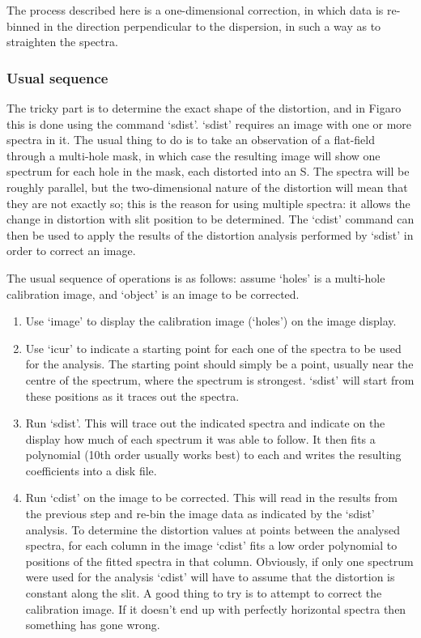    The process described here is a one-dimensional correction, in which
   data is re-binned in the direction perpendicular to the dispersion, in
   such a way as to straighten the spectra.


\subsubsection{\label{techno7usual}Usual sequence}

   The tricky part is to determine the exact shape of the distortion,
   and in Figaro this is done using the command `sdist'.  `sdist'
   requires an image with one or more spectra in it.  The usual thing to
   do is to take an observation of a flat-field through a multi-hole
   mask, in which case the resulting image will show one spectrum for
   each hole in the mask, each distorted into an S. The spectra will be
   roughly parallel, but the two-dimensional nature of the distortion
   will mean that they are not exactly so; this is the reason for using
   multiple spectra: it allows the change in distortion with slit
   position to be determined.  The `cdist' command can then be used to
   apply the results of the distortion analysis performed by `sdist' in
   order to correct an image.

   The usual sequence of operations is as follows: assume `holes' is a
   multi-hole calibration image, and `object' is an image to be
   corrected.

\begin{enumerate}
\item
   Use `image' to display the calibration image (`holes') on the image
   display.
\item
   Use `icur' to indicate a starting point for each one of the spectra
   to be used for the analysis.  The starting point should simply be a
   point, usually near the centre of the spectrum, where the spectrum is
   strongest. `sdist' will start from these positions as it traces out
   the spectra.
\item
   Run `sdist'.  This will trace out the indicated spectra and indicate
   on the display how much of each spectrum it was able to follow.  It
   then fits a polynomial (10th order usually works best) to each and
   writes the resulting coefficients into a disk file.
\item
   Run `cdist' on the image to be corrected.  This will read in the
   results from the previous step and re-bin the image data as indicated
   by the `sdist' analysis.  To determine the distortion values at points
   between the analysed spectra, for each column in the image `cdist'
   fits a low order polynomial to positions of the fitted spectra in
   that column.  Obviously, if only one spectrum were used for the analysis
   `cdist' will have to assume that the distortion is constant along the
   slit. A good thing to try is to attempt to correct the calibration
   image.  If it doesn't end up with perfectly horizontal spectra then
   something has gone wrong.
\end{enumerate}

